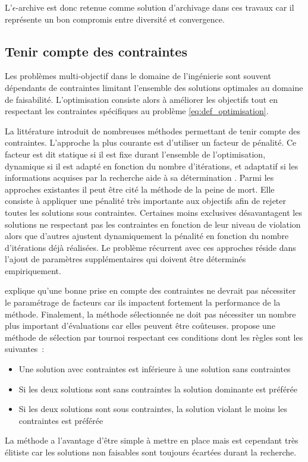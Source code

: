 L’$\epsilon$-archive est donc retenue comme solution d’archivage dans ces travaux
car il représente un bon compromis entre diversité et convergence.


\subsection{Tenir compte des contraintes} %
\label{sub:tenir_compte_des_contraintes}
Les problèmes multi-objectif dans le domaine de l’ingénierie sont souvent
dépendants de contraintes limitant l’ensemble des solutions optimales au domaine
de faisabilité. L’optimisation consiste alors à améliorer les objectifs tout en
respectant les contraintes spécifiques au problème \eqref{eq:def_optimisation}.

La littérature introduit de nombreuses méthodes permettant de tenir compte des
contraintes. L’approche la plus courante est d’utiliser un facteur de pénalité. Ce facteur
est dit statique si il est fixe durant l’ensemble de l’optimisation, dynamique si il est
adapté en fonction du nombre d’itérations, et adaptatif si les informations acquises par la
recherche aide à sa détermination \parencite{Coello2002}. Parmi les approches existantes il
peut être cité la méthode de la peine de mort. Elle consiste à appliquer une pénalité très
importante aux objectifs afin de rejeter toutes les solutions sous contraintes. Certaines
moins exclusives désavantagent les solutions ne respectant pas les contraintes en fonction
de leur niveau de violation alors que d’autres ajustent dynamiquement la pénalité en
fonction du nombre d’itérations déjà réalisées. Le problème récurrent avec ces approches
réside dans l’ajout de paramètres supplémentaires qui doivent être déterminés empiriquement.

\textcite{Coello2002} explique qu’une bonne prise en compte des contraintes ne devrait
pas nécessiter le paramétrage de facteurs car ils impactent
fortement la performance de la méthode. Finalement, la méthode sélectionnée ne
doit pas nécessiter un nombre plus important d’évaluations car elles peuvent être coûteuses.
\textcite{Deb2000311} propose une méthode de sélection par tournoi respectant ces conditions
dont les règles sont les suivantes~:
\begin{itemize}
  \item Une solution avec contraintes est inférieure à une solution sans contraintes
  \item Si les deux solutions sont sans contraintes la solution dominante est préférée
  \item Si les deux solutions sont sous contraintes, la solution violant le moins les contraintes est préférée
\end{itemize}
La méthode a l’avantage d’être simple à mettre en place mais est cependant
très élitiste car les solutions non faisables sont toujours écartées durant la
recherche.

